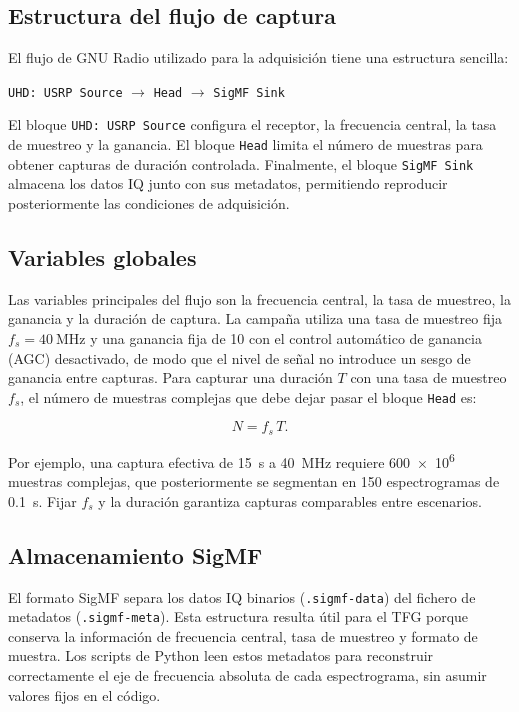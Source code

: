 \subsection{Estructura del flujo de captura}

El flujo de GNU Radio utilizado para la adquisición tiene una estructura sencilla:

\begin{center}
\texttt{UHD: USRP Source} $\rightarrow$ \texttt{Head} $\rightarrow$ \texttt{SigMF Sink}
\end{center}

El bloque \texttt{UHD: USRP Source} configura el receptor, la frecuencia central, la tasa de muestreo y la ganancia. El bloque \texttt{Head} limita el número de muestras para obtener capturas de duración controlada. Finalmente, el bloque \texttt{SigMF Sink} almacena los datos IQ junto con sus metadatos, permitiendo reproducir posteriormente las condiciones de adquisición.

\subsection{Variables globales}

Las variables principales del flujo son la frecuencia central, la tasa de muestreo, la ganancia y la duración de captura. La campaña utiliza una tasa de muestreo fija $f_s = \SI{40}{\mega\hertz}$ y una ganancia fija de \num{10} con el control automático de ganancia (AGC) desactivado, de modo que el nivel de señal no introduce un sesgo de ganancia entre capturas. Para capturar una duración $T$ con una tasa de muestreo $f_s$, el número de muestras complejas que debe dejar pasar el bloque \texttt{Head} es:

\begin{equation}
N = f_s\, T.
\end{equation}

Por ejemplo, una captura efectiva de \SI{15}{\second} a \SI{40}{\mega\hertz} requiere \num{600e6} muestras complejas, que posteriormente se segmentan en \num{150} espectrogramas de \SI{0.1}{\second}. Fijar $f_s$ y la duración garantiza capturas comparables entre escenarios.

\subsection{Almacenamiento SigMF}

El formato SigMF separa los datos IQ binarios (\texttt{.sigmf-data}) del fichero de metadatos (\texttt{.sigmf-meta}). Esta estructura resulta útil para el TFG porque conserva la información de frecuencia central, tasa de muestreo y formato de muestra. Los scripts de Python leen estos metadatos para reconstruir correctamente el eje de frecuencia absoluta de cada espectrograma, sin asumir valores fijos en el código.




